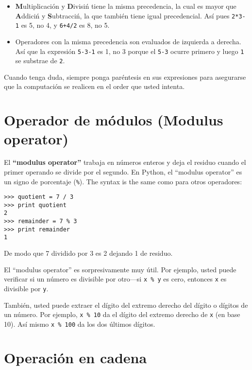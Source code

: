 \begin{ex}
\begin{itemize}
\item {\bf M}ultiplicaci\'on y {\bf D}ivisi\'n tiene la misma precedencia,
la cual es mayor que {\bf A}ddici\'n y {\bf S}ubtracci\'n, la que tambi\'en tiene igual precedencial. As\'i pues {\tt 2*3-1} es 5, no 4, y
{\tt 6+4/2} es 8, no 5.

\item Operadores con la misma precedencia son evaluados de izquierda a derecha. As\'i que la expresi\'on {\tt 5-3-1} es 1, no 3 porque el 
{\tt 5-3} ocurre primero y luego {\tt 1} se substrae de {\tt 2}.

\end{itemize}

Cuando tenga duda, siempre ponga par\'entesis en sus expresiones para asegurarse que la computaci\'on se realicen en el order que usted intenta.

\section{Operador de m\'odulos (Modulus operator)}






El {\bf ``modulus operator''} trabaja en n\'umeros enteros y deja el residuo cuando el primer operando se divide por el segundo. En Python, el 
``modulus operator'' es un signo de porcentaje (\verb"%").  The syntax is the same
como para otros operadores:


\beforeverb
\begin{verbatim}
>>> quotient = 7 / 3
>>> print quotient
2
>>> remainder = 7 % 3
>>> print remainder
1
\end{verbatim}
\afterverb
%

De modo que 7 dividido por 3 es 2 dejando 1 de residuo.

El ``modulus operator'' es sorpresivamente muy \'util. Por ejemplo, usted puede verificar si un n\'umero es divisible por otro---si
{\tt x \% y} es cero, entonces {\tt x} es divisible por {\tt y}.


Tambi\'en, usted puede extraer el d\'igito del extremo derecho del d\'igito o d\'igitos de un n\'umero. Por ejemplo, {\tt x \% 10} da el d\'igito del extremo derecho de {\tt x} (en base 10).  As\'i mismo {\tt x \% 100}
da los dos \'ultimos d\'igitos.



\section{Operaci\'on en cadena}


\end{ex}
